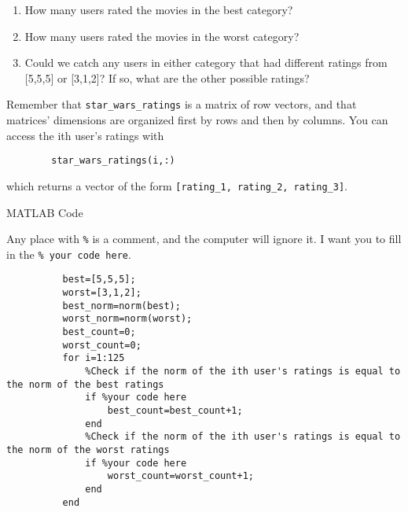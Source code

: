 \documentclass{ximera}
\begin{document}
\begin{exploration}
  \begin{enumerate}

      \item How many users rated the movies in the best category?
      \item How many users rated the movies in the worst category?
      \item Could we catch any users in either category that had different ratings from [5,5,5] or [3,1,2]? If so, what are the other possible ratings?
      
  \end{enumerate}

  \begin{remark}

      Remember that \texttt{star\_wars\_ratings} is a matrix of row vectors, and that matrices' dimensions are organized first by rows and then by columns. You can access the ith user's ratings with 
 
    \begin{verbatim}
        star_wars_ratings(i,:)
    \end{verbatim}

      
      which returns a vector of the form \texttt{[rating\_1, rating\_2, rating\_3]}.

  \end{remark}

  \begin{remark}{MATLAB Code}

      Any place with \texttt{\%} is a comment, and the computer will ignore it. I want you to fill in the \texttt{\% your code here}.

    \begin{verbatim}
          best=[5,5,5];
          worst=[3,1,2];
          best_norm=norm(best);
          worst_norm=norm(worst);
          best_count=0;
          worst_count=0;
          for i=1:125
              %Check if the norm of the ith user's ratings is equal to the norm of the best ratings
              if %your code here
                  best_count=best_count+1;
              end
              %Check if the norm of the ith user's ratings is equal to the norm of the worst ratings
              if %your code here
                  worst_count=worst_count+1;
              end
          end
    \end{verbatim}

  \end{remark}

\end{exploration}
\end{document}
